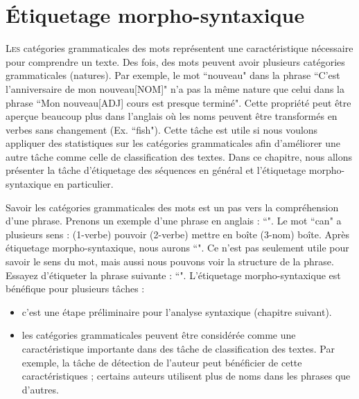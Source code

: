 \documentclass{KodeBook}
\begin{document}
		\mainmatter
	
\fi
\chapter{Étiquetage morpho-syntaxique}

\begin{introduction}
	\lettrine{L}{es} catégories grammaticales des mots représentent une caractéristique nécessaire pour comprendre un texte. 
	Des fois, des mots peuvent avoir plusieurs catégories grammaticales (natures). 
	Par exemple, le mot ``nouveau" dans la phrase ``C'est l'anniversaire de mon nouveau[NOM]" n'a pas la même nature que celui dans la phrase ``Mon nouveau[ADJ] cours est presque terminé". 
	Cette propriété peut être aperçue beaucoup plus dans l'anglais où les noms peuvent être transformés en verbes sans changement (Ex. ``fish"). 
	Cette tâche est utile si nous voulons appliquer des statistiques sur les catégories grammaticales afin d'améliorer une autre tâche comme celle de classification des textes. 
	Dans ce chapitre, nous allons présenter la tâche d'étiquetage des séquences en général et l'étiquetage morpho-syntaxique en particulier.
\end{introduction} 

Savoir les catégories grammaticales des mots est un pas vers la compréhension d'une phrase.
Prenons un exemple d'une phrase en anglais : ``". 
Le mot ``can" a plusieurs sens : (1-verbe) pouvoir (2-verbe) mettre en boîte (3-nom) boîte.
Après étiquetage morpho-syntaxique, nous aurons ``".
Ce n'est pas seulement utile pour savoir le sens du mot, mais aussi nous pouvons voir la structure de la phrase.
Essayez d'étiqueter la phrase suivante : ``".
L'étiquetage morpho-syntaxique est bénéfique pour plusieurs tâches :
\begin{itemize}
	\item c'est une étape préliminaire pour l'analyse syntaxique (chapitre suivant).
	\item les catégories grammaticales peuvent être considérée comme une caractéristique importante dans des tâche de classification des textes. 
	Par exemple, la tâche de détection de l'auteur peut bénéficier de cette caractéristiques ; certains auteurs utilisent plus de noms dans les phrases que d'autres.
\end{itemize}
\end{document}
